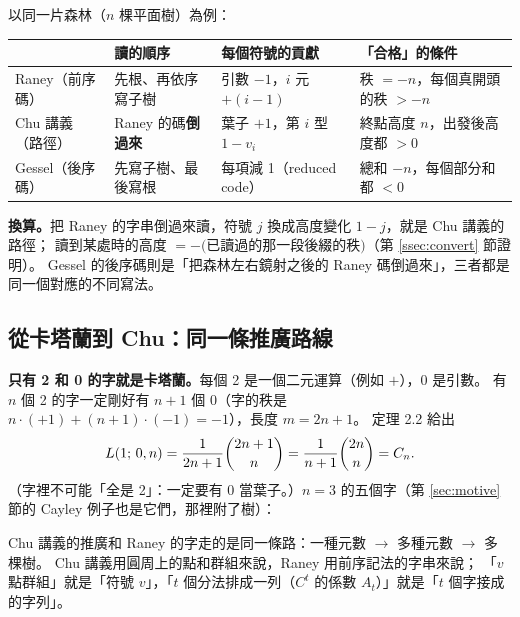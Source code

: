 \begin{keybox}
以同一片森林（$n$ 棵平面樹）為例：
\begin{center}
\small
\renewcommand{\arraystretch}{1.3}
\begin{tabular}{@{}>{\raggedright}p{2.6cm}>{\raggedright}p{3.2cm}>{\raggedright}p{3.6cm}>{\raggedright\arraybackslash}p{4.6cm}@{}}
\toprule
 & 讀的順序 & 每個符號的貢獻 & 「合格」的條件\\
\midrule
Raney（前序碼） & 先根、再依序寫子樹 & 引數 $-1$，$i$ 元 $+(i-1)$ & 秩 $=-n$，每個真開頭的秩 $>-n$\\
Chu 講義（路徑） & Raney 的碼\textbf{倒過來} & 葉子 $+1$，第 $i$ 型 $1-v_i$ & 終點高度 $n$，出發後高度都 $>0$\\
Gessel（後序碼） & 先寫子樹、最後寫根 & 每項減 1（reduced code） & 總和 $-n$，每個部分和都 $<0$\\
\bottomrule
\end{tabular}
\end{center}
\textbf{換算。}把 Raney 的字串倒過來讀，符號 $j$ 換成高度變化 $1-j$，就是 Chu 講義的路徑；
讀到某處時的高度 $=-($已讀過的那一段後綴的秩$)$（第 \ref{ssec:convert} 節證明）。
Gessel 的後序碼則是「把森林左右鏡射之後的 Raney 碼倒過來」，三者都是同一個對應的不同寫法。
\end{keybox}

\subsection{從卡塔蘭到 Chu：同一條推廣路線 \extra}\label{ssec:ladder}

\textbf{只有 2 和 0 的字就是卡塔蘭。}每個 2 是一個二元運算（例如 $+$），0 是引數。
有 $n$ 個 2 的字一定剛好有 $n+1$ 個 0（字的秩是 $n\cdot(+1)+(n+1)\cdot(-1)=-1$），長度 $m=2n+1$。
定理 2.2 給出
\[
L(1;\,0,n)=\frac{1}{2n+1}\binom{2n+1}{n}=\frac{1}{n+1}\binom{2n}{n}=C_n .
\]
（字裡不可能「全是 2」：一定要有 0 當葉子。）$n=3$ 的五個字（第 \ref{sec:motive} 節的 Cayley 例子也是它們，那裡附了樹）：

\begin{table}[H]
\centering\small
\RanBinaryWords
\caption{只有 2、0 的字（$n=3$）＝滿二元樹＝加括號的方式，共 $C_3=5$ 個。
第三欄是倒過來讀、每個符號 $a$ 走 $1-a$ 的 Chu 講義路徑：出發後一直 $>0$，終點高度 1。}
\label{tab:binarywords}
\end{table}

Chu 講義的推廣和 Raney 的字走的是同一條路：一種元數 $\to$ 多種元數 $\to$ 多棵樹。
Chu 講義用圓周上的點和群組來說，Raney 用前序記法的字串來說；
「$v$ 點群組」就是「符號 $v$」，「$t$ 個分法排成一列（$C^t$ 的係數 $A_t$）」就是「$t$ 個字接成的字列」。

